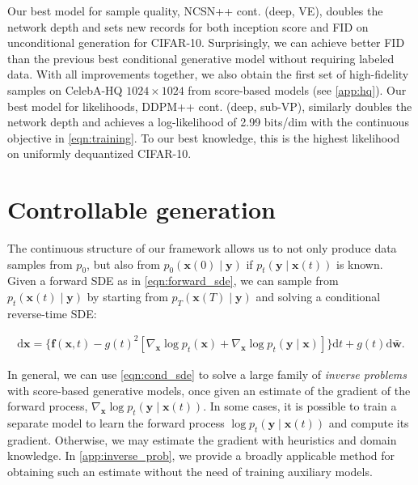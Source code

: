 Our best model for sample quality, NCSN++ cont. (deep, VE), doubles the network depth and sets new records for both inception score and FID on unconditional generation for CIFAR-10. Surprisingly, we can achieve better FID than the previous best conditional generative model without requiring labeled data. With all improvements together, we also obtain the first set of high-fidelity samples on CelebA-HQ $1024\times 1024$ from score-based models (see \ref{app:hq}). Our best model for likelihoods, DDPM++ cont. (deep, sub-VP), similarly doubles the network depth and achieves a log-likelihood of 2.99 bits/dim with the continuous objective in \ref{eqn:training}. To our best knowledge, this is the highest likelihood on uniformly dequantized CIFAR-10.

\section{Controllable generation} The continuous structure of our framework allows us to not only produce data samples from $p_0$, but also from $p_0(\mathbf{x}(0) \mid \mathbf{y})$ if $p_t(\mathbf{y} \mid \mathbf{x}(t))$ is known. Given a forward SDE as in \ref{eqn:forward_sde}, we can sample from $p_t(\mathbf{x}(t) \mid \mathbf{y})$ by starting from $p_T(\mathbf{x}(T) \mid \mathbf{y})$ and solving a conditional reverse-time SDE:

\begin{align}
\mathrm{d} \mathbf{x} = \{\mathbf{f}(\mathbf{x}, t) - g(t)^2[ \nabla_\mathbf{x}  \log p_t(\mathbf{x})+  \nabla_{\mathbf{x}}  \log p_t(\mathbf{y} \mid \mathbf{x})]\} \mathrm{d} t + g(t) \mathrm{d} \bar{\mathbf{w}}.\label{eqn:cond_sde}
\end{align}

In general, we can use \ref{eqn:cond_sde} to solve a large family of \emph{inverse problems} with score-based generative models, once given an estimate of the gradient of the forward process, $\nabla_\mathbf{x} \log p_t(\mathbf{y} \mid \mathbf{x}(t) )$. In some cases, it is possible to train a separate model to learn the forward process $\log p_t(\mathbf{y} \mid \mathbf{x}(t))$ and compute its gradient. Otherwise, we may estimate the gradient with heuristics and domain knowledge. In \ref{app:inverse_prob}, we provide a broadly applicable method for obtaining such an estimate without the need of training auxiliary models.

